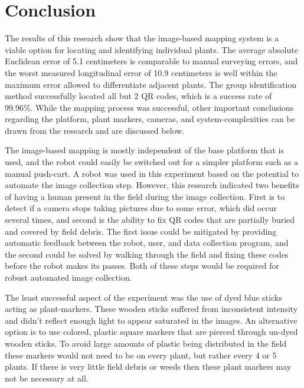 
\cleardoublepage

\chapter{Conclusion}
\label{chapter:conclusion}

The results of this research show that the image-based mapping system is a viable option for locating and identifying individual plants.  The average absolute Euclidean error of 5.1 centimeters is comparable to manual surveying errors, and the worst measured longitudinal error of 10.9 centimeters is well within the maximum error allowed to differentiate adjacent plants.  The group identification method successfully located all but 2 QR codes, which is a success rate of 99.96\%.  While the mapping process was successful, other important conclusions regarding the platform, plant markers, cameras, and system-complexities can be drawn from the research and are discussed below.

The image-based mapping is mostly independent of the base platform that is used, and the robot could easily be switched out for a simpler platform such as a manual push-cart.  A robot was used in this experiment based on the potential to automate the image collection step.  However, this research indicated two benefits of having a human present in the field during the image collection.  First is to detect if a camera stops taking pictures due to some error, which did occur several times, and second is the ability to fix QR codes that are partially buried and covered by field debris.  The first issue could be mitigated by providing automatic feedback between the robot, user, and data collection program, and the second could be solved by walking through the field and fixing these codes before the robot makes its passes.  Both of these steps would be required for robust automated image collection.       

The least successful aspect of the experiment was the use of dyed blue sticks acting as plant-markers.  These wooden sticks suffered from inconsistent intensity and didn't reflect enough light to appear saturated in the images.  An alternative option is to use colored, plastic square markers that are pierced through un-dyed wooden sticks.  To avoid large amounts of plastic being distributed in the field these markers would not need to be on every plant, but rather every 4 or 5 plants.  If there is very little field debris or weeds then these plant markers may not be necessary at all. 

